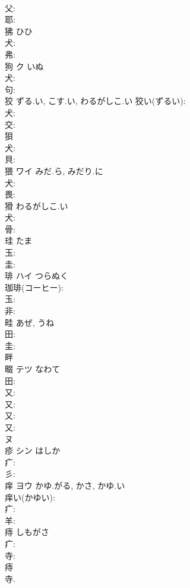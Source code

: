 \documentclass[8pt]{extreport}
\begin{document}
\begin{CJK}{UTF8}{min}
\\	父: 
\\	耶: 
\\	狒		ひひ				
\\	犬: 
\\	弗: 
\\	狗	ク	いぬ		
\\	犬: 
\\	句: 
\\	狡		ずる.い, こす.い, わるがしこ.い			狡い(ずるい): 
\\	犬: 
\\	交: 
\\	狽						
\\	犬: 
\\	貝: 
\\	猥	ワイ	みだ.ら, みだり.に		
\\	犬: 
\\	畏: 
\\	猾		わるがしこ.い				
\\	犬: 
\\	骨: 
\\	珪		たま				
\\	玉: 
\\	圭: 
\\	琲	ハイ	つらぬく		
\\	珈琲(コーヒー): 
\\	玉: 
\\	非: 
\\	畦		あぜ, うね				
\\	田: 
\\	圭: 
\\	畔 
\\	畷	テツ	なわて		
\\	田: 
\\	又: 
\\	又: 
\\	又: 
\\	又: 
\\	ヌ
\\	疹	シン	はしか		
\\	疒: 
\\	彡: 
\\	痒	ヨウ	かゆ.がる, かさ, かゆ.い		
\\	痒い(かゆい): 
\\	疒: 
\\	羊: 
\\	痔		しもがさ				
\\	疒: 
\\	寺: 
\\	痔 
\\	寺.

\end{CJK}
\end{document}
